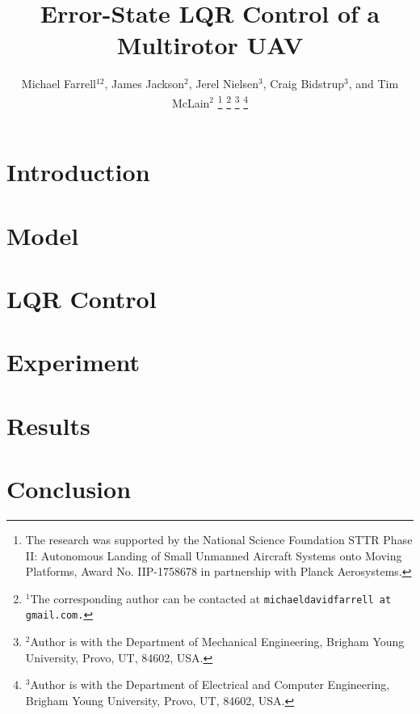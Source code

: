 \documentclass[letterpaper, 10 pt, conference]{ieeeconf}
\title{\LARGE \bf
  Error-State LQR Control of a Multirotor UAV
}
\author{Michael Farrell$^{12}$, James Jackson$^{2}$, Jerel Nielsen$^{3}$, Craig Bidstrup$^{3}$, and Tim McLain$^{2}$%
\thanks{The research was supported by the National Science Foundation STTR Phase II: Autonomous Landing of Small Unmanned Aircraft Systems onto Moving Platforms, Award No. IIP-1758678 in partnership with Planck Aerosystems.}
\thanks{$^{1}$The corresponding author can be contacted at
      \tt{michaeldavidfarrell at gmail.com}.}%
\thanks{$^{2}$Author is with the Department of Mechanical Engineering,
        Brigham Young University, Provo, UT, 84602, USA.}%
\thanks{$^{3}$Author is with the Department of Electrical and Computer Engineering,
        Brigham Young University, Provo, UT, 84602, USA.}%
}
\begin{document}
\maketitle
\thispagestyle{empty}
\pagestyle{empty}







\section{Introduction}




\section{Model} \label{sec:model}


%


\section{LQR Control} \label{sec:lqr_control}


%

\section{Experiment} \label{sec:experiment}




\section{Results} \label{sec:results}



\section{Conclusion} \label{sec:conclusion}



\appendix
\label{app:error_state_der}




\end{document}
